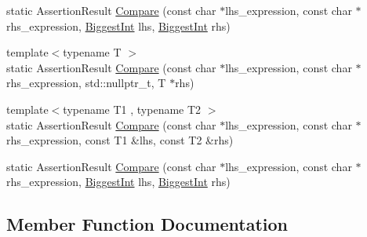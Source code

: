 \begin{DoxyCompactItemize}
\item 
static Assertion\+Result \mbox{\hyperlink{classtesting_1_1internal_1_1_eq_helper_aaa42c0059bb3dcc43d556243febb5f1c}{Compare}} (const char $\ast$lhs\+\_\+expression, const char $\ast$rhs\+\_\+expression, \mbox{\hyperlink{namespacetesting_1_1internal_a05c6bd9ede5ccdf25191a590d610dcc6}{Biggest\+Int}} lhs, \mbox{\hyperlink{namespacetesting_1_1internal_a05c6bd9ede5ccdf25191a590d610dcc6}{Biggest\+Int}} rhs)
\item 
{\footnotesize template$<$typename T $>$ }\\static Assertion\+Result \mbox{\hyperlink{classtesting_1_1internal_1_1_eq_helper_a2bbb6deaafe1ca824e94c0e20f1d824c}{Compare}} (const char $\ast$lhs\+\_\+expression, const char $\ast$rhs\+\_\+expression, std\+::nullptr\+\_\+t, T $\ast$rhs)
\item 
{\footnotesize template$<$typename T1 , typename T2 $>$ }\\static Assertion\+Result \mbox{\hyperlink{classtesting_1_1internal_1_1_eq_helper_ae3572c7374534a916b9117efaa89f33f}{Compare}} (const char $\ast$lhs\+\_\+expression, const char $\ast$rhs\+\_\+expression, const T1 \&lhs, const T2 \&rhs)
\item 
static Assertion\+Result \mbox{\hyperlink{classtesting_1_1internal_1_1_eq_helper_aaa42c0059bb3dcc43d556243febb5f1c}{Compare}} (const char $\ast$lhs\+\_\+expression, const char $\ast$rhs\+\_\+expression, \mbox{\hyperlink{namespacetesting_1_1internal_a05c6bd9ede5ccdf25191a590d610dcc6}{Biggest\+Int}} lhs, \mbox{\hyperlink{namespacetesting_1_1internal_a05c6bd9ede5ccdf25191a590d610dcc6}{Biggest\+Int}} rhs)
\end{DoxyCompactItemize}


\subsection{Member Function Documentation}
\mbox{\label{classtesting_1_1internal_1_1_eq_helper_ae3572c7374534a916b9117efaa89f33f}} 
